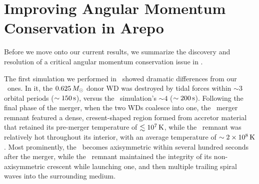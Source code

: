 \section{Improving Angular Momentum Conservation in Arepo}
\label{sec:c3_fixingarepo}

Before we move onto our current results, we summarize the discovery and resolution of a critical angular momentum conservation issue in \arepo.

The first simulation we performed in \arepo\ showed dramatic differences from our \gasoline\ ones.  In it, the $0.625\,\Msun$ donor WD was destroyed by tidal forces within $\sim3$ orbital periods ($\sim150\,\mathrm{s}$), versus the \gasoline\ simulation's $\sim4$ ($\sim200\,\mathrm{s}$).  Following the final phase of the merger, when the two WDs coalesce into one, the \arepo\ merger remnant featured a dense, cresent-shaped region formed from accretor material that retained its pre-merger temperature of $\lesssim10^7\,\mathrm{K}$, while the \gasoline\ remnant was relatively hot throughout its interior, with an average temperature of $\sim2\times10^8\,\mathrm{K}$.  Most prominently, the \gasoline\ becomes axisymmetric within several hundred seconds after the merger, while the \arepo\ remnant maintained the integrity of its non-axisymmetric crescent while launching one, and then multiple trailing spiral waves into the surrounding medium.


